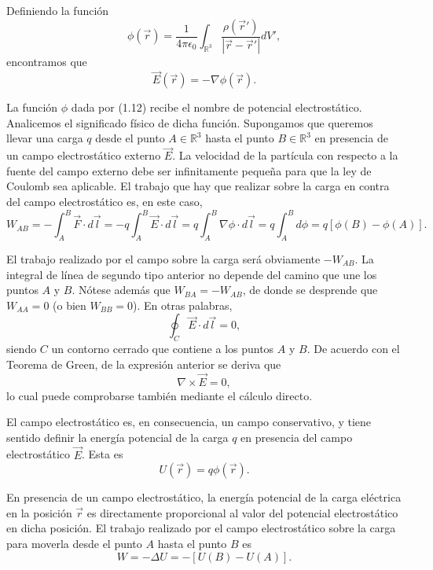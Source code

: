 \documentclass[12pt,a4paper]{book}
\begin{document}
Definiendo la función
\begin{equation}
\phi(\vec{r}) = \frac{1}{4\pi\epsilon_0} \int_{\mathbb{R}^3} \frac{\rho(\vec{r}')}{|\vec{r}-\vec{r}'|}dV',
\end{equation}
encontramos que
\begin{equation}
\vec{E}(\vec{r}) = -\nabla\phi(\vec{r}).
\end{equation}

La función $\phi$ dada por (1.12) recibe el nombre de potencial electrostático. Analicemos el significado físico de dicha función. Supongamos que queremos llevar una carga $q$ desde el punto $A \in \mathbb{R}^3$ hasta el punto $B \in \mathbb{R}^3$ en presencia de un campo electrostático externo $\vec{E}$. La velocidad de la partícula con respecto a la fuente del campo externo debe ser infinitamente pequeña para que la ley de Coulomb sea aplicable. El trabajo que hay que realizar sobre la carga en contra del campo electrostático es, en este caso,
\begin{equation}
W_{AB} = -\int_{A}^{B} \vec{F} \cdot d\vec{l} = -q \int_{A}^{B} \vec{E} \cdot d\vec{l} = q \int_{A}^{B} \nabla\phi \cdot d\vec{l} = q \int_{A}^{B} d\phi = q[\phi(B) - \phi(A)].
\end{equation}

El trabajo realizado por el campo sobre la carga será obviamente $-W_{AB}$. La integral de línea de segundo tipo anterior no depende del camino que une los puntos $A$ y $B$. Nótese además que $W_{BA} = -W_{AB}$, de donde se desprende que $W_{AA} = 0$ (o bien $W_{BB} = 0$). En otras palabras,
\begin{equation}
\oint_{C} \vec{E} \cdot d\vec{l} = 0,
\end{equation}
siendo $C$ un contorno cerrado que contiene a los puntos $A$ y $B$. De acuerdo con el Teorema de Green, de la expresión anterior se deriva que
\begin{equation}
\nabla \times \vec{E} = 0,
\end{equation}
lo cual puede comprobarse también mediante el cálculo directo.

El campo electrostático es, en consecuencia, un campo conservativo, y tiene sentido definir la energía potencial de la carga $q$ en presencia del campo electrostático $\vec{E}$. Esta es
\begin{equation}
U(\vec{r}) = q\phi(\vec{r}).
\end{equation}

En presencia de un campo electrostático, la energía potencial de la carga eléctrica en la posición $\vec{r}$ es directamente proporcional al valor del potencial electrostático en dicha posición. El trabajo realizado por el campo electrostático sobre la carga para moverla desde el punto $A$ hasta el punto $B$ es
\begin{equation}
W = -\Delta U = -[U(B) - U(A)].
\end{equation}
\end{document}
